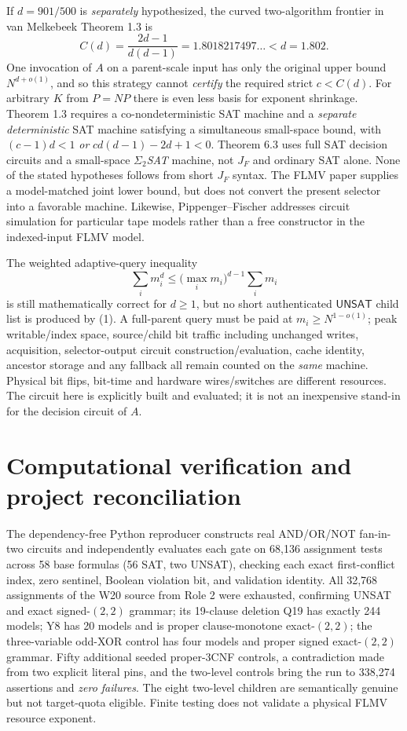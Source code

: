 \documentclass[11pt]{article}
\newcommand{\UNSAT}{\mathsf{UNSAT}}
\begin{document}
If $d=901/500$ is \emph{separately} hypothesized, the curved two-algorithm frontier in van Melkebeek Theorem 1.3 \cite{vm2007} is
\[
 C(d)=\frac{2d-1}{d(d-1)}=1.8018217497\ldots<d=1.802.\tag{8}
\]
One invocation of $A$ on a parent-scale input has only the original upper bound $N^{d+o(1)}$, and so this strategy cannot \emph{certify} the required strict $c<C(d)$. For arbitrary $K$ from $P=NP$ there is even less basis for exponent shrinkage. Theorem 1.3 requires a co-nondeterministic SAT machine and a \emph{separate deterministic} SAT machine satisfying a simultaneous small-space bound, with $(c-1)d<1$ \emph{or} $cd(d-1)-2d+1<0$. Theorem 6.3 uses full SAT decision circuits and a small-space \emph{$\Sigma_2$SAT} machine, not $J_F$ and ordinary SAT alone. None of the stated hypotheses follows from short $J_F$ syntax. The FLMV paper \cite{flmv2005} supplies a model-matched joint lower bound, but does not convert the present selector into a favorable machine. Likewise, Pippenger--Fischer \cite{pf1979} addresses circuit simulation for particular tape models rather than a free constructor in the indexed-input FLMV model.

The weighted adaptive-query inequality
\[
\sum_i m_i^d\le \bigl(\max_i m_i\bigr)^{d-1}\sum_i m_i
\tag{9}
\]
is still mathematically correct for $d\ge1$, but no short authenticated $\UNSAT$ child list is produced by (1). A full-parent query must be paid at $m_i\ge N^{1-o(1)}$; peak writable/index space, source/child bit traffic including unchanged writes, acquisition, selector-output circuit construction/evaluation, cache identity, ancestor storage and any fallback all remain counted on the \emph{same} machine. Physical bit flips, bit-time and hardware wires/switches are different resources. The circuit here is explicitly built and evaluated; it is not an inexpensive stand-in for the decision circuit of $A$.

\section{Computational verification and project reconciliation}
The dependency-free Python reproducer constructs real AND/OR/NOT fan-in-two circuits and independently evaluates each gate on 68,136 assignment tests across 58 base formulas (56 SAT, two UNSAT), checking each exact first-conflict index, zero sentinel, Boolean violation bit, and validation identity. All 32,768 assignments of the W20 source from Role 2 were exhausted, confirming UNSAT and exact signed-$(2,2)$ grammar; its 19-clause deletion Q19 has exactly 244 models; Y8 has 20 models and is proper clause-monotone exact-$(2,2)$; the three-variable odd-XOR control has four models and proper signed exact-$(2,2)$ grammar. Fifty additional seeded proper-3CNF controls, a contradiction made from two explicit literal pins, and the two-level controls bring the run to 338,274 assertions and \emph{zero failures}. The eight two-level children are semantically genuine but not target-quota eligible. Finite testing does not validate a physical FLMV resource exponent.
\end{document}
